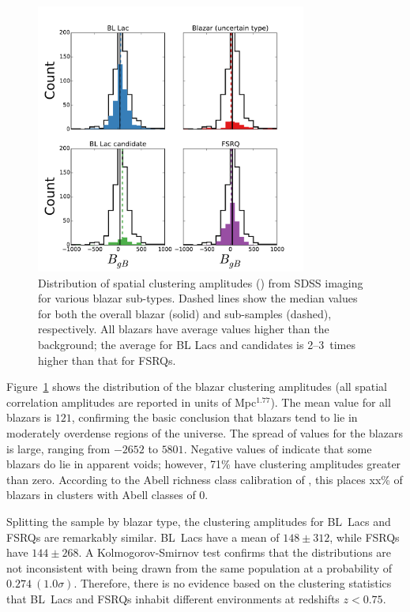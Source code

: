 \documentclass{emulateapj}
\begin{document}
\begin{figure}
\includegraphics[width=3.5in]{figures/bgb_hist.pdf}
\caption{Distribution of spatial clustering amplitudes (\bgb) from SDSS imaging for various blazar sub-types. Dashed lines show the median \bgb{} values for both the overall blazar (solid) and sub-samples (dashed), respectively. All blazars have average \bgb{} values higher than the background; the average \bgb{} for BL Lacs and candidates is 2--3~times higher than that for FSRQs.
\label{fig:bgb_hist}}
\end{figure}

Figure~\ref{fig:bgb_hist} shows the distribution of the blazar clustering amplitudes (all spatial correlation amplitudes are reported in units of Mpc$^{1.77}$). The mean value for all blazars is $121$, confirming the basic conclusion that blazars tend to lie in moderately overdense regions of the universe. The spread of \bgb{} values for the blazars is large, ranging from $-2652$ to $5801$. Negative values of \bgb{} indicate that some blazars do lie in apparent voids; however, 71\% have clustering amplitudes greater than zero. According to the Abell richness class calibration of \citet{yee99}, this places {\note xx\% of blazars in clusters with Abell classes of 0.}

Splitting the sample by blazar type, the clustering amplitudes for BL~Lacs and FSRQs are remarkably similar. BL~Lacs have a mean \bgb{} of $148\pm312$, while FSRQs have $144\pm268$. A Kolmogorov-Smirnov test confirms that the distributions are not inconsistent with being drawn from the same population at a probability of $0.274~(1.0\sigma)$. Therefore, there is no evidence based on the clustering statistics that BL~Lacs and FSRQs inhabit different environments at redshifts $z<0.75$. 
\end{document}
